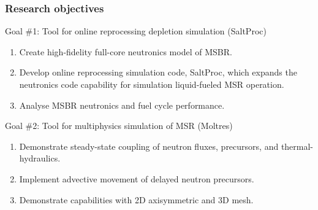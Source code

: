 \begin{frame}
  \frametitle{Research objectives}
                  \vspace*{-0.1in}
              \begin{block}{Goal \#1: Tool for online reprocessing depletion simulation (SaltProc)\cite{rykhlevskii_saltproc}}
               \begin{enumerate}
                \item Create high-fidelity full-core neutronics model of MSBR.
                \item Develop online reprocessing simulation code, SaltProc, which expands the neutronics code capability for simulation liquid-fueled \gls{MSR} operation.
                \item Analyse \gls{MSBR} neutronics and fuel cycle performance.
               \end{enumerate}
               \end{block}

              \begin{block}{Goal \#2: Tool for multiphysics simulation of \gls{MSR} (Moltres)\cite{lindsay_introduction_2018}}
               \begin{enumerate}
                \item Demonstrate steady-state coupling of neutron fluxes, precursors, and thermal-hydraulics.
                \item Implement advective movement of delayed neutron precursors.
                \item Demonstrate capabilities with 2D axisymmetric and 3D mesh.
               \end{enumerate}
               \end{block}


              
\end{frame}
